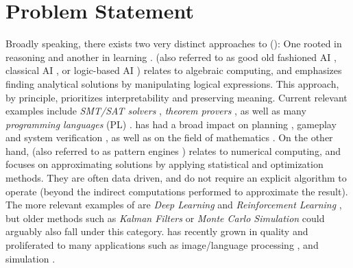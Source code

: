 \chapter{Problem Statement} \label{Chapter:Problem Statement}

Broadly speaking, there exists  two very distinct approaches to \emph{\AILong{}}  (\emph{\AI{}}): One rooted in reasoning and another in learning \citep{Platzer_2024, booch2021thinking}.  \SiAI{} (also referred to as good old fashioned AI \citep{haugeland1989artificial}, classical AI \citep{garnelo2019reconciling},  or logic-based AI \citep{thomason2003logic}) relates to algebraic computing, and emphasizes finding analytical solutions by manipulating logical expressions. This approach, by principle, prioritizes interpretability and preserving meaning. Current relevant examples include \emph{SMT/SAT solvers} \citep{barrett2018satisfiability, alyahya2022structure}, \emph{theorem provers} \citep{bartek2025vampire, barras1999coq},  as well as many \emph{programming languages} (PL) \citep{korner2022fifty, perkel2019julia, klabnik2023rust}.
 \SiAI{} has had a broad impact on planning \citep{geffner2013concise}, gameplay \citep{newell1958chess} and system verification \citep{leroy2016compcert, tihanyi2025new}, as well as on the field of mathematics \cite{Blokpoel2024}.  On the other hand, \SuAI{} (also referred to as pattern engines \citep{julia2020there})
relates to numerical computing,  and focuses on approximating solutions by applying statistical and optimization methods. They are often data driven, and do not require an explicit algorithm to operate (beyond the indirect computations performed to approximate the result). The more relevant examples of \SuAI{} are \emph{Deep Learning} \citep{norvig2002modern} and \emph{Reinforcement Learning} \citep{sutton1998reinforcement}, but older methods such as \emph{Kalman Filters} \citep{simon2001kalman} or \emph{Monte Carlo Simulation} \citep{martin2024computing} could arguably also fall under this category.  \SuAI{} has recently grown in quality and proliferated to many applications such as image/language processing \citep{thapa2024application, vaswani2017attention}, and simulation \citep{jumper2021highly}. 

